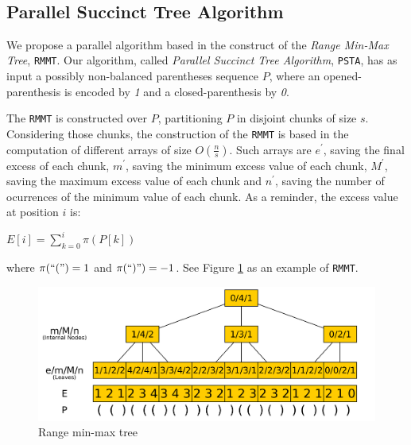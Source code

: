 \\

\subsection{Parallel Succinct Tree Algorithm}

We propose a parallel algorithm based in the construct of the \emph{Range Min-Max Tree}, {\tt RMMT}\cite{Navarro:2014:FFS:2620785.2601073}. Our algorithm, called \emph{Parallel Succinct Tree Algorithm}, {\tt PSTA}, has as input a possibly non-balanced parentheses sequence $P$, where an opened-parenthesis is encoded by \emph{1} and a closed-parenthesis by \emph{0}.

The {\tt RMMT} is constructed over $P$, partitioning $P$ in disjoint chunks of size $s$. Considering those chunks, the construction of the {\tt RMMT} is based in the computation of different arrays of size $O(\frac{n}{s})$. Such arrays are $e^{\prime}$, saving the final excess of each chunk, $m^{\prime}$, saving the minimum excess value of each chunk, $M^{\prime}$, saving the maximum excess value of each chunk and $n^{\prime}$, saving the number of ocurrences of the minimum value of each chunk. As a reminder, the excess value at position $i$ is:
	\begin{center}
		$\displaystyle E[i] = \sum_{k=0}^{i} \pi(P[k])$	
	\end{center}

where $\pi(``(") = 1$ and $\pi(``)") = -1$. See Figure \ref{fig:RangeMinMaxTree} as an example of {\tt RMMT}.

 	\begin{figure}[ht]
		\centering
		\includegraphics[scale=0.13]{./images/Range-min-max-tree.png}
     	\caption{Range min-max tree}
		\label{fig:RangeMinMaxTree} 
	\end{figure}

